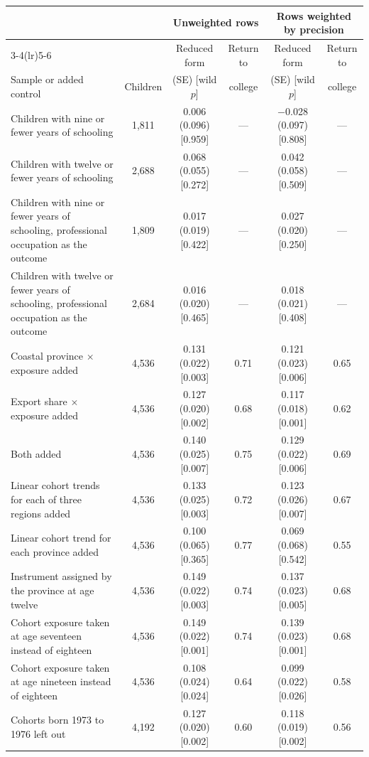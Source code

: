 \begin{tabular}{@{}p{4.6cm}ccccc@{}}
\toprule
 & & \multicolumn{2}{c}{Unweighted rows} & \multicolumn{2}{c}{Rows weighted by precision} \\
\cmidrule(lr){3-4}\cmidrule(lr){5-6}
 & & Reduced form & Return to & Reduced form & Return to \\
Sample or added control & Children & (SE) [wild $p$] & college & (SE) [wild $p$] & college \\
\midrule
Children with nine or fewer years of schooling & 1,811 & 0.006 (0.096) [0.959] & --- & $-$0.028 (0.097) [0.808] & --- \\
Children with twelve or fewer years of schooling & 2,688 & 0.068 (0.055) [0.272] & --- & 0.042 (0.058) [0.509] & --- \\
Children with nine or fewer years of schooling, professional occupation as the outcome & 1,809 & 0.017 (0.019) [0.422] & --- & 0.027 (0.020) [0.250] & --- \\
Children with twelve or fewer years of schooling, professional occupation as the outcome & 2,684 & 0.016 (0.020) [0.465] & --- & 0.018 (0.021) [0.408] & --- \\
Coastal province $\times$ exposure added & 4,536 & 0.131 (0.022) [0.003] & 0.71 & 0.121 (0.023) [0.006] & 0.65 \\
Export share $\times$ exposure added & 4,536 & 0.127 (0.020) [0.002] & 0.68 & 0.117 (0.018) [0.001] & 0.62 \\
Both added & 4,536 & 0.140 (0.025) [0.007] & 0.75 & 0.129 (0.022) [0.006] & 0.69 \\
Linear cohort trends for each of three regions added & 4,536 & 0.133 (0.025) [0.003] & 0.72 & 0.123 (0.026) [0.007] & 0.67 \\
Linear cohort trend for each province added & 4,536 & 0.100 (0.065) [0.365] & 0.77 & 0.069 (0.068) [0.542] & 0.55 \\
Instrument assigned by the province at age twelve & 4,536 & 0.149 (0.022) [0.003] & 0.74 & 0.137 (0.023) [0.005] & 0.68 \\
Cohort exposure taken at age seventeen instead of eighteen & 4,536 & 0.149 (0.022) [0.001] & 0.74 & 0.139 (0.023) [0.001] & 0.68 \\
Cohort exposure taken at age nineteen instead of eighteen & 4,536 & 0.108 (0.024) [0.024] & 0.64 & 0.099 (0.022) [0.026] & 0.58 \\
Cohorts born 1973 to 1976 left out & 4,192 & 0.127 (0.020) [0.002] & 0.60 & 0.118 (0.019) [0.002] & 0.56 \\
\bottomrule
\end{tabular}
